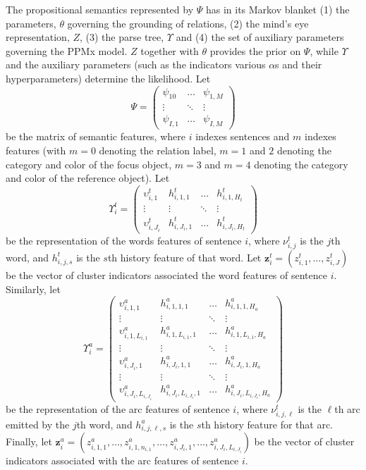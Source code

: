 \documentclass[12pt]{article}
\begin{document}
The propositional semantics represented by $\Psi$ has in its Markov blanket (1) the parameters, $\theta$ governing the grounding of relations, (2) the mind's eye representation, $Z$, (3) the parse tree, $\Upsilon$ and (4) the set of auxiliary parameters governing the PPMx model.  $Z$ together with $\theta$ provides the prior on $\Psi$, while $\Upsilon$ and the auxiliary parameters (such as the indicators various $\alpha$s and their hyperparameters) determine the likelihood.  Let 
\begin{equation*}
\Psi = \left(\begin{array}{ccc} \psi_{10} & \dots & \psi_{1,M} \\ \vdots & \ddots & \vdots \\ \psi_{I,1} & \dots & \psi_{I,M} \end{array}\right)
\end{equation*}
be the matrix of semantic features, where $i$ indexes sentences and $m$ indexes features (with $m=0$ denoting the relation label, $m=1$ and $2$ denoting the category and color of the focus object, $m=3$ and $m=4$ denoting the category and color of the reference object).  Let
\begin{equation*}
\Upsilon^t_i = \left(\begin{array}{cccc} \upsilon^t_{i,1} & h^t_{i,1,1} & \dots & h^t_{i,1,H_t} \\ \vdots & \vdots & \ddots & \vdots \\ \upsilon^t_{i,J_i} & h^t_{i,J_i,1} & \dots & h^t_{i,J_i,H_t} \end{array} \right)
\end{equation*}
be the representation of the words features of sentence $i$, where $\nu^t_{i,j}$ is the $j$th word, and $h^t_{i,j,s}$ is the $s$th history feature of that word.  Let $\mathbf{z}^t_i = \left(z^t_{i,1}, \dots, z^t_{i,J}\right)$ be the vector of cluster indicators associated the word features of sentence $i$.  Similarly, let
\begin{equation*}
\Upsilon^a_i = \left(\begin{array}{cccc} \upsilon^a_{i,1,1} & h^a_{i,1,1,1} & \dots & h^a_{i,1,1,H_a} \\ \vdots & \vdots & \ddots & \vdots \\ \upsilon^a_{i,1,L_{i,1}} & h^a_{i,1,L_{i,1},1} & \dots & h^a_{i,1,L_{i,1},H_a} \\ \vdots & \vdots & \ddots & \vdots \\ \upsilon^a_{i,J_i,1} & h^a_{i,J_i,1,1} & \dots & h^a_{i,J_i,1,H_a} \\ \vdots & \vdots & \ddots & \vdots \\ \upsilon^a_{i,J_i, L_{i,J_i}} & h^a_{i,J_i,L_{i,J_i},1} & \dots & h^a_{i,J_i,L_{i,J_i},H_a} \end{array} \right)
\end{equation*}
be the representation of the arc features of sentence $i$, where $\nu^t_{i,j,\ell}$ is the $\ell$th arc emitted by the $j$th word, and $h^a_{i,j,\ell,s}$ is the $s$th history feature for that arc.  Finally, let $\mathbf{z}^a_i = \left(z^a_{i,1,1}, \dots, z^a_{i,1,n_{i,1}}, \dots, z^a_{i,J_i,1}, \dots, z^a_{i,J_i,L_{i,J_i}}\right)$ be the vector of cluster indicators associated with the arc features of sentence $i$.
\end{document}
